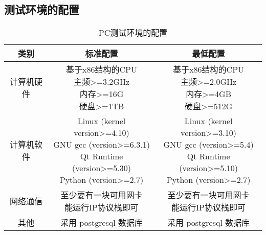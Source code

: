 \newpage
\subsection{测试环境的配置}
\begin{table}[htbp]
\centering
\caption{PC测试环境的配置} \label{tab:pctest-environment}
\begin{tabular}{|c|c|c|}
    \hline
    类别 & 标准配置 & 最低配置 \\
    \hline
    计算机硬件 & \tabincell{c}{基于x86结构的CPU\\ 主频>=3.2GHz\\ 内存>=16G\\ 硬盘>=1TB} & \tabincell{c}{基于x86结构的CPU\\ 主频>=2.0GHz\\ 内存>=4GB\\ 硬盘>=512G} \\
    \hline
    计算机软件 & 
    \tabincell{c} {
        Linux (kernel version>=4.10)\\ 
        GNU gcc (version>=6.3.1)\\
        Qt Runtime (version>=5.30)\\
        Python (version>=2.7)\\
        } & 
    \tabincell{c} {
        Linux (kernel version>=3.10)\\ 
        GNU gcc (version>=5.4)\\
        Qt Runtime (version>=5.10)\\
        Python (version>=2.7)\\
        } \\
    \hline
    网络通信 & \tabincell{c}{至少要有一块可用网卡\\ 能运行IP协议栈即可} & \tabincell{c}{至少要有一块可用网卡\\ 能运行IP协议栈即可} \\
    \hline
    其他 & 采用 postgresql 数据库 & 采用 postgresql 数据库 \\
    \hline
\end{tabular}
\end{table}

